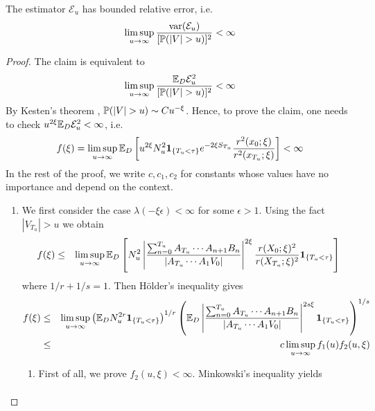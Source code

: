\documentclass{article}
\begin{document}
\begin{theorem}
  The estimator $\mathcal E_u$ has bounded relative error, i.e.
  \begin{equation*}
    \limsup_{u \to \infty} {\var(\mathcal E_u) \over [\P(|V| > u)]^2} < \infty
  \end{equation*}
\end{theorem}
\begin{proof}
  The claim is equivalent to
  \[
  \limsup_{u \to \infty} {\E_D \mathcal E_u^2 \over [\P(|V| > u)]^2} < \infty
  \]
  By Kesten's theorem \cite{Kesten1973}, $\P(|V| > u) \sim C
  u^{-\xi}$. Hence, to prove the claim, one needs to check
  $u^{2\xi}\E_D \mathcal E_u^2 < \infty$, i.e.
  \[
  f(\xi) = \limsup_{u \to \infty} \E_D  \left[u^{2\xi}
    N_u^2 \1{T_u < \tau} e^{-2\xi S_{T_u}} {r^2(x_0; \xi)
      \over r^2(x_{T_u}; \xi)}\right]
  < \infty
  \]
  In the rest of the proof, we write $c, c_1, c_2$ for constants whose values
  have no importance and depend on the context.
  \begin{enumerate}
  \item We first consider the case $\lambda(-\xi\epsilon) < \infty$ for some
    $\epsilon > 1$. Using the fact $|V_{T_u}| > u$  we obtain
    \begin{eqnarray*}
      f(\xi) &\leq& \limsup_{u \to \infty} \E_D \left[
        N_u^2  \left|
          \frac{
            \sum_{n=0}^{T_u} A_{T_u} \cdots A_{n+1} B_n 
          }{
            |A_{T_u} \cdots A_1 V_0|
          }
        \right|^{2 \xi}
        \frac{
          r(X_0; \xi)^2
        }{
          r(X_{T_u}; \xi)^2
        } \1{T_u < \tau}
      \right] \\
    \end{eqnarray*}
    where $1/r + 1/s = 1$. Then H\"older's inequality gives
    \begin{eqnarray*}
      f(\xi) &\leq& \limsup_{u \to \infty}
      \left(\E_D N_u^{2r} \1{T_u < \tau}\right)^{1/r}
      \left(\E_D \left|
          \frac{
            \sum_{n=0}^{T_u} A_{T_u} \cdots A_{n+1} B_n 
          }{
            |A_{T_u} \cdots A_1 V_0|
          }
        \right|^{2 s \xi} \1{T_u < \tau}
      \right)^{1/s} \\
      &\leq& c \limsup_{u \to \infty} f_1(u) f_2(u, \xi)
    \end{eqnarray*}
    \begin{enumerate}
    \item First of all, we prove $f_2(u,\xi) < \infty$. Minkowski's
      inequality yields
      \begin{eqnarray*}

\end{eqnarray*}
\end{enumerate}
\end{enumerate}
\end{proof}
\end{document}
